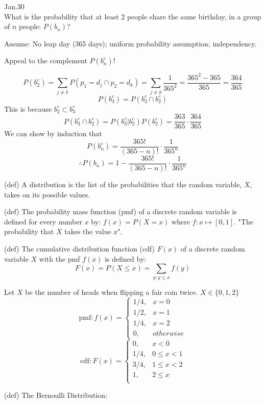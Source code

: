 \documentclass[12pt]{article}
\begin{document}
Jan.30\\
What is the probability that at least 2 people share the same birthday, in a group of \(n\) people: \(P(b_n)\)?

Assume: No leap day (365 days); uniform probability assumption; independency.

Appeal to the complement \(P(b_n^c)\)!

\[P(b_2^c) = \sum_{j\not= k}P(p_1=d_j\cap p_2=d_k) = \sum_{j\not= k}\frac1{365^2}=\frac{365^2-365}{365}=\frac{364}{365}\]
\[P(b_3^c) = P(b_3^c\cap b_2^c)\]
This is because \(b_2^c\subset b_3^c\)
\[P(b_3^c\cap b_2^c) = P(b_3^c|b_2^c)P(b_2^c) = \frac{363}{365}\cdot\frac{364}{365}\]
We can show by induction that \[P(b_n^c) = \frac{365!}{(365-n)!}\cdot\frac{1}{365^n}\]\[\therefore P(b_n) = 1 - \frac{365!}{(365-n)!}\cdot\frac{1}{365^n}\]

(def) A distribution is the list of the probabilities that the random variable, \(X\), takes on its possible values.

(def) The probability mass function (pmf) of a discrete random variable is defined for every number \(x\) by: \(f(x) = P(X=x)\) where \(f:x\mapsto[0,1]\). "The probability that \(X\) takes the value \(x\)".

(def) The cumulative distribution function (cdf) \(F(x)\) of a discrete random variable \(X\) with the pmf \(f(x)\) is defined by: \[F(x) = P(X\leq x) = \sum_{y:y\leq x}f(y)\]

Let \(X\) be the number of heads when flipping a fair coin twice. \(X\in\{0,1,2\}\)
\[\text{pmf} : f(x)=\begin{cases}
1/4, & x=0\\
1/2, & x=1\\
1/4, & x=2\\
0, & otherwise
\end{cases}\]
\[\text{cdf} : F(x)=\begin{cases}
0, & x<0\\
1/4, & 0\leq x < 1\\
3/4, &  1\leq x < 2\\
1, &  2\leq x \\ 
\end{cases}\]

(def) The Bernoulli Distribution:
\end{document}
